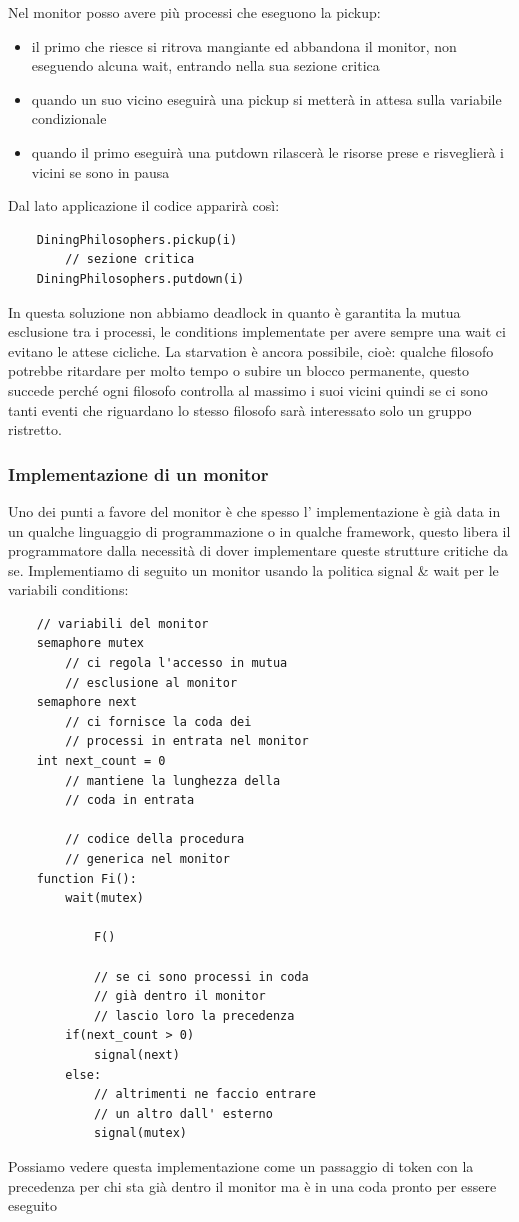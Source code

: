 Nel monitor posso avere più processi che eseguono la pickup:
\begin{itemize}
    \item il primo che riesce si ritrova mangiante ed abbandona il monitor, non eseguendo alcuna wait, entrando nella sua sezione critica
    \item quando un suo vicino eseguirà una pickup si metterà in attesa sulla variabile condizionale
    \item quando il primo eseguirà una putdown rilascerà le risorse prese e risveglierà i vicini se sono in pausa
\end{itemize}

Dal lato applicazione il codice apparirà così:
\begin{verbatim}
    DiningPhilosophers.pickup(i)
        // sezione critica
    DiningPhilosophers.putdown(i)
\end{verbatim}

In questa soluzione non abbiamo deadlock in quanto è garantita la mutua esclusione tra i processi, le conditions implementate per avere sempre una wait ci evitano le attese cicliche.
La starvation è ancora possibile, cioè: qualche filosofo potrebbe ritardare per molto tempo o subire un blocco permanente, questo succede perché ogni filosofo controlla al massimo i suoi vicini quindi se ci sono tanti eventi che riguardano lo stesso filosofo sarà interessato solo un gruppo ristretto. 

\subsubsection{Implementazione di un monitor}
Uno dei punti a favore del monitor è che spesso l' implementazione è già data in un qualche linguaggio di programmazione o in qualche framework, questo libera il programmatore dalla necessità di dover implementare queste strutture critiche da se.
Implementiamo di seguito un monitor usando la politica signal \& wait per le variabili conditions:
\begin{verbatim}
    // variabili del monitor
    semaphore mutex
        // ci regola l'accesso in mutua 
        // esclusione al monitor
    semaphore next
        // ci fornisce la coda dei
        // processi in entrata nel monitor
    int next_count = 0
        // mantiene la lunghezza della
        // coda in entrata

        // codice della procedura
        // generica nel monitor
    function Fi():
        wait(mutex)

            F()

            // se ci sono processi in coda
            // già dentro il monitor
            // lascio loro la precedenza
        if(next_count > 0)
            signal(next)
        else:
            // altrimenti ne faccio entrare
            // un altro dall' esterno
            signal(mutex)
\end{verbatim}
Possiamo vedere questa implementazione come un passaggio di token con la precedenza per chi sta già dentro il monitor ma è in una coda pronto per essere eseguito

